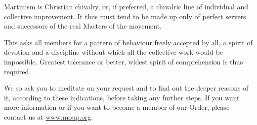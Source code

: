 Martinism is Christian chivalry, or, if preferred, a chivalric line of individual and
collective improvement. It thus must tend to be made up only of perfect servers
and successors of the real Masters of the movement.

This asks all members for a pattern of behaviour freely accepted by all, a spirit of
devotion and a discipline without which all the collective work would be
impossible. Greatest tolerance or better, widest spirit of comprehension is thus
required.

We so ask you to meditate on your request and to find out the deeper reasons of it,
according to these indications, before taking any further steps.
If you want more information or if you want to become a member of our Order,
please contact us at \url{www.moup.org}.